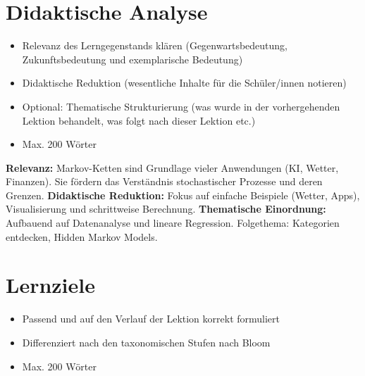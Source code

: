 \section*{Didaktische Analyse}
\begin{tcolorbox}[colback=gray!10, colframe=gray!80!black, title={Anforderungen}]
    \begin{itemize}
        \item Relevanz des Lerngegenstands klären (Gegenwartsbedeutung, Zukunftsbedeutung und exemplarische Bedeutung)
        \item Didaktische Reduktion (wesentliche Inhalte für die Schüler/innen notieren)
        \item Optional: Thematische Strukturierung (was wurde in der vorhergehenden Lektion behandelt, was folgt nach dieser Lektion etc.)
        \item Max. 200 Wörter
    \end{itemize}
\end{tcolorbox}
\textbf{Relevanz:} Markov-Ketten sind Grundlage vieler Anwendungen (KI, Wetter, Finanzen). Sie fördern das Verständnis stochastischer Prozesse und deren Grenzen.\newline
\textbf{Didaktische Reduktion:} Fokus auf einfache Beispiele (Wetter, Apps), Visualisierung und schrittweise Berechnung.\newline
\textbf{Thematische Einordnung:} Aufbauend auf Datenanalyse und lineare Regression. Folgethema: Kategorien entdecken, Hidden Markov Models.

\section*{Lernziele}
\begin{tcolorbox}[colback=gray!10, colframe=gray!80!black, title=Anforderungen]
    \begin{itemize}
        \item Passend und auf den Verlauf der Lektion korrekt formuliert
        \item Differenziert nach den taxonomischen Stufen nach Bloom 
        \item Max. 200 Wörter
    \end{itemize}
\end{tcolorbox}

